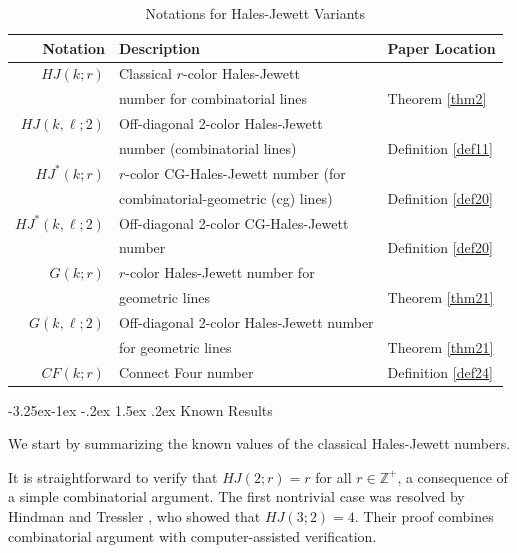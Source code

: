 \documentclass[11pt]{article}
\makeatletter
\theoremstyle{definition}
\renewcommand\subsection{\@startsection{subsection}{2}{\z@}%
{-3.25ex\@plus -1ex \@minus -.2ex}%
{1.5ex \@plus .2ex}%
{\normalfont\normalsize\bfseries}}
\makeatother
\begin{document}
\begin{table}[ht!]\small
\centering
\renewcommand{\arraystretch}{1.2}
\begin{tabular}{r| l | l}
\toprule
\textbf{Notation} & \textbf{Description} &\textbf{Paper Location} \\
\midrule
$HJ(k;r)$ & Classical $r$-color Hales-Jewett\\& number for combinatorial lines &Theorem \ref{thm2}\\

$HJ(k,\ell;2)$ & Off-diagonal 2-color Hales-Jewett\\& number (combinatorial lines)&Definition \ref{def11} \\

$HJ^*(k;r)$ & $r$-color CG-Hales-Jewett number (for\\& combinatorial-geometric (cg) lines)&Definition \ref{def20} \\

$HJ^*(k,\ell;2)$ & Off-diagonal 2-color CG-Hales-Jewett\\& number &Definition \ref{def20}\\

$G(k;r)$ & $r$-color Hales-Jewett number for\\& geometric lines&Theorem \ref{thm21} \\

$G(k,\ell;2)$ & Off-diagonal 2-color Hales-Jewett number\\& for geometric lines&Theorem \ref{thm21} \\
$CF(k;r)$&Connect Four number&Definition \ref{def24}\\
\bottomrule
\end{tabular}
\caption{Notations for Hales-Jewett Variants}
\label{tab:HJnotation}
\end{table}

 
\subsection{Known Results}




We start by summarizing the known  values of the classical Hales-Jewett numbers. 

It is straightforward to verify that $HJ(2;r) = r$ for all $r \in \mathbb{Z}^+$, a consequence of a simple combinatorial argument. The first nontrivial case was resolved by Hindman and Tressler \cite{HT}, who showed that $HJ(3;2) = 4.$
Their proof combines combinatorial argument with computer-assisted verification.
\end{document}
